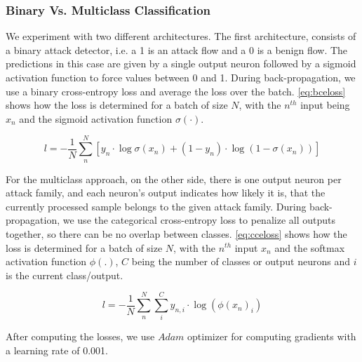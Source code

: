 \documentclass[conference]{IEEEtran}
\begin{document}
\subsubsection{Binary Vs. Multiclass Classification}
We experiment with two different architectures. The first architecture, consists of a binary attack detector, i.e. a 1 is an attack flow and a 0 is a benign flow. The predictions in this case are given by a single output neuron followed by a sigmoid activation function to force values between 0 and 1. During back-propagation, we use a binary cross-entropy loss and average the loss over the batch. \autoref{eq:bceloss} shows how the loss is determined for a batch of size $N$, with the $n^{th}$ input being $x_{n}$ and the sigmoid activation function $\sigma(\cdot)$.

\begin{equation}
\label{eq:bceloss}
l = - \frac{1}{N} \sum_{n}^{N} [y_n \cdot \log \sigma (x_{n}) + (1 - y_n) \cdot \log (1 - \sigma (x_{n}))]
\end{equation}

For the multiclass approach, on the other side, there is one output neuron per attack family, and each neuron's output indicates how likely it is, that the currently processed sample belongs to the given attack family. During back-propagation, we use the categorical cross-entropy loss to penalize all outputs together, so there can be no overlap between classes. \autoref{eq:cceloss} shows how the loss is determined for a batch of size $N$, with the $n^{th}$ input $x_{n}$ and the softmax activation function \cite{noauthor_softmax_2020} $\phi(.)$, $C$ being the number of classes or output neurons and $i$ is the current class/output.

\begin{equation}
\label{eq:cceloss}
l = - \frac{1}{N} \sum_{n}^{N} \sum_{i}^{C} y_{n,i} \cdot \log (\phi(x_{n})_{i})
\end{equation}

After computing the losses, we use $Adam$ optimizer \cite{kingma_adam_2017} for computing gradients with a learning rate of 0.001.
\end{document}
